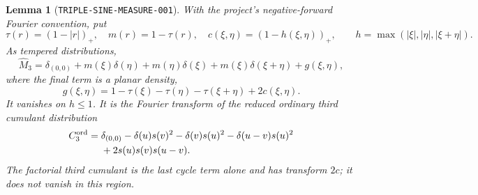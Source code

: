 \documentclass[11pt]{article}
\newtheorem{lemma}{Lemma}
\begin{document}
\begin{lemma}[\texttt{TRIPLE-SINE-MEASURE-001}]
\label{lem:triple-sine-measure}
With the project's negative-forward Fourier convention, put
\[
 \tau(r)=(1-|r|)_+,\quad m(r)=1-\tau(r),\quad
 c(\xi,\eta)=(1-h(\xi,\eta))_+,
 \qquad h=\max(|\xi|,|\eta|,|\xi+\eta|).
\]
As tempered distributions,
\begin{equation}\label{eq:triple-sine-fourier}
 \widehat M_3=\delta_{(0,0)}+m(\xi)\delta(\eta)
 +m(\eta)\delta(\xi)+m(\xi)\delta(\xi+\eta)+g(\xi,\eta),
\end{equation}
where the final term is a planar density,
\begin{equation}\label{eq:triple-sine-cumulant-density}
 g(\xi,\eta)=1-\tau(\xi)-\tau(\eta)-\tau(\xi+\eta)+2c(\xi,\eta).
\end{equation}
It vanishes on \(h\leq1\). It is the Fourier transform of the reduced
ordinary third cumulant distribution
\begin{equation}\label{eq:triple-sine-ordinary-cumulant}
 \begin{split}
 C_3^{\rm ord}={}&\delta_{(0,0)}-\delta(u)s(v)^2
 -\delta(v)s(u)^2-\delta(u-v)s(u)^2\\
 &+2s(u)s(v)s(u-v).
 \end{split}
\end{equation}
The factorial third cumulant is the last cycle term alone and has
transform \(2c\); it does not vanish in this region.
\end{lemma}
\end{document}
